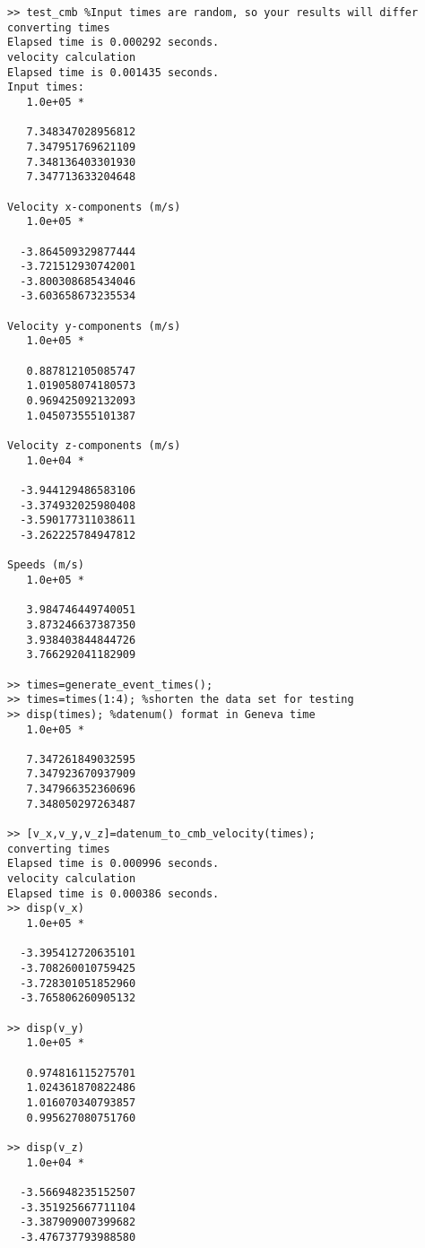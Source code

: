 \documentclass[12pt]{report}
\begin{document}
\begin{verbatim}
>> test_cmb %Input times are random, so your results will differ
converting times
Elapsed time is 0.000292 seconds.
velocity calculation
Elapsed time is 0.001435 seconds.
Input times:
   1.0e+05 *

   7.348347028956812
   7.347951769621109
   7.348136403301930
   7.347713633204648

Velocity x-components (m/s)
   1.0e+05 *

  -3.864509329877444
  -3.721512930742001
  -3.800308685434046
  -3.603658673235534

Velocity y-components (m/s)
   1.0e+05 *

   0.887812105085747
   1.019058074180573
   0.969425092132093
   1.045073555101387

Velocity z-components (m/s)
   1.0e+04 *

  -3.944129486583106
  -3.374932025980408
  -3.590177311038611
  -3.262225784947812

Speeds (m/s)
   1.0e+05 *

   3.984746449740051
   3.873246637387350
   3.938403844844726
   3.766292041182909

>> times=generate_event_times();
>> times=times(1:4); %shorten the data set for testing
>> disp(times); %datenum() format in Geneva time
   1.0e+05 *

   7.347261849032595
   7.347923670937909
   7.347966352360696
   7.348050297263487

>> [v_x,v_y,v_z]=datenum_to_cmb_velocity(times);
converting times
Elapsed time is 0.000996 seconds.
velocity calculation
Elapsed time is 0.000386 seconds.
>> disp(v_x)
   1.0e+05 *

  -3.395412720635101
  -3.708260010759425
  -3.728301051852960
  -3.765806260905132

>> disp(v_y)
   1.0e+05 *

   0.974816115275701
   1.024361870822486
   1.016070340793857
   0.995627080751760

>> disp(v_z)
   1.0e+04 *

  -3.566948235152507
  -3.351925667711104
  -3.387909007399682
  -3.476737793988580
\end{verbatim}
\end{document}

